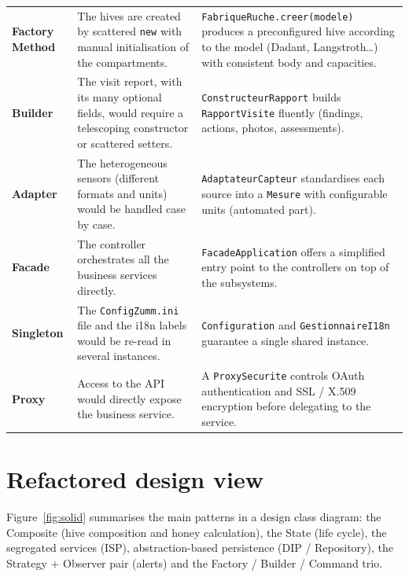 \begin{xltabular}{\textwidth}{>{\bfseries}p{2.7cm} p{5.9cm} X}
Factory Method  &
The hives are created by scattered \texttt{new} with manual initialisation of
the compartments. &
\texttt{FabriqueRuche.creer(modele)} produces a preconfigured hive according to
the model (Dadant, Langstroth\ldots) with consistent body and capacities. \\
Builder  &
The visit report, with its many optional fields, would require a telescoping
constructor or scattered setters. &
\texttt{ConstructeurRapport} builds \texttt{RapportVisite} fluently
(findings, actions, photos, assessments). \\
Adapter  &
The heterogeneous sensors (different formats and units) would be handled case by
case. &
\texttt{AdaptateurCapteur} standardises each source into a \texttt{Mesure} with
configurable units (automated part). \\
Facade  &
The controller orchestrates all the business services directly. &
\texttt{FacadeApplication} offers a simplified entry point to the controllers on
top of the subsystems. \\
Singleton  &
The \texttt{ConfigZumm.ini} file and the i18n labels would be re-read in several
instances. &
\texttt{Configuration} and \texttt{GestionnaireI18n} guarantee a single shared
instance. \\
Proxy  &
Access to the API would directly expose the business service. &
A \texttt{ProxySecurite} controls OAuth authentication and SSL / X.509
encryption before delegating to the service. \\
\bottomrule
\end{xltabular}

\section{Refactored design view}
Figure~\ref{fig:solid} summarises the main patterns in a design class diagram:
the Composite (hive composition and honey calculation), the State (life cycle),
the segregated services (ISP), abstraction-based persistence (DIP / Repository),
the Strategy + Observer pair (alerts) and the Factory / Builder / Command trio.

